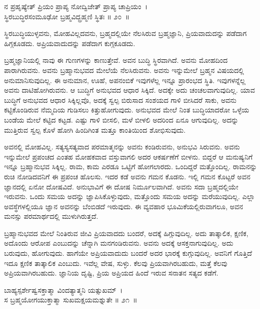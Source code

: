 \begin{shloka}
ನ ಪ್ರಹೃಷ್ಯೇತ್ ಪ್ರಿಯಂ ಪ್ರಾಪ್ಯ ನೋದ್ವಿಜೇತ್ ಪ್ರಾಪ್ಯ ಚಾಪ್ರಿಯಂ~।\\ಸ್ಥಿರಬುದ್ಧಿರಸಂಮೂಢೋ ಬ್ರಹ್ಮವಿದ್ಬ್ರಹ್ಮಣಿ ಸ್ಥಿತಃ \hfill॥ ೨೦~॥
\end{shloka}

\begin{artha}
ಸ್ಥಿರಬುದ್ಧಿಯುಳ್ಳವನು, ಮೋಹವಿಲ್ಲದವನು, ಬ್ರಹ್ಮದಲ್ಲಿಯೇ ನೆಲಸಿರುವ ಬ್ರಹ್ಮಜ್ಞಾನಿ, ಪ್ರಿಯವಾದುದನ್ನು ಪಡೆದಾಗ ಹಿಗ್ಗಕೂಡದು. ಅಪ್ರಿಯವಾದುದನ್ನು ಪಡೆದಾಗ ಕುಗ್ಗಕೂಡದು.
\end{artha}

ಬ್ರಹ್ಮಜ್ಞಾನಿಯಲ್ಲಿ ನಾವು ಈ ಗುಣಗಳನ್ನು ಕಾಣುತ್ತೇವೆ. ಅವನ ಬುದ್ಧಿ ಸ್ಥಿರವಾಗಿದೆ. ಅವನು ಮೋಹದಿಂದ ಪಾರಾಗಿರುವನು. ಅವನು ಬ್ರಹ್ಮಾನುಭವದ ಮೇಲೆಯೆ ನೆಲಸಿರುವನು. ಅವನು ಇನ್ನುಮೇಲೆ ಬ್ರಹ್ಮನ ವಿಷಯದಲ್ಲಿ ಅನುಮಾನಿಸುವುದಿಲ್ಲ. ಈ ಅನುಮಾನ, ಊಹೆ, ಅಪನಂಬಿಕೆ ಇವುಗಳೆಲ್ಲ ಇನ್ನೂ ಪ್ರಾರಂಭದ ಸ್ಥಿತಿ. ಇವುಗಳನ್ನೆಲ್ಲ ಅವನು ದಾಟಿಹೋಗಿರುವನು. ಆ ಬುದ್ಧಿಗೆ ಅನುಭವದ ಆಧಾರ ಸಿಕ್ಕಿದೆ. ಅದಕ್ಕೇ ಅದು ಚಂಚಲವಾಗುವುದಿಲ್ಲ. ಯಾವ ಬುದ್ಧಿಗೆ ಅನುಭವದ ಆಧಾರ ಸಿಕ್ಕಿಲ್ಲವೊ, ಅದಕ್ಕೆ ಸ್ವಲ್ಪ ಬಿರುಸಾದ ಸಂಶಯದ ಗಾಳಿ ಬೀಸಿದರೆ ಸಾಕು, ಅವನು ಕಟ್ಟಿಕೊಂಡಿರುವ ನೆಮ್ಮದಿಯ ಗುಡಿಸಲು ಕಿತ್ತುಹೋಗುವುದು. ಅನುಭವದ ಮೇಲೆ ನಿಂತ ಬುದ್ಧಿಯಾದರೋ ಒಳ್ಳೆಯ ಬಂಡೆಯ ಮೇಲೆ ಕಟ್ಟಿದ ಕಟ್ಟಡ. ಎಷ್ಟು ಗಾಳಿ ಬೀಸಲಿ, ಮಳೆ ಬೀಳಲಿ ಅದರಿಂದ ಏನೂ ಆಗುವುದಿಲ್ಲ. ಅದನ್ನು ಮುತ್ತಿರುವ ಸ್ವಲ್ಪ ಕೊಳೆ ಹೋಗಿ ಹಿಂದಿಗಿಂತ ಮತ್ತೂ ಕಾಂತಿಯಿಂದ ಶೋಭಿಸುವುದು.

ಅವನಲ್ಲಿ ಮೋಹವಿಲ್ಲ. ಸತ್ಯಸ್ಯಸತ್ಯವಾದ ಪರಮಾತ್ಮನನ್ನು ಅವನು ಕಂಡಿರುವನು, ಅನುಭವಿ ಸಿರುವನು. ಅವನು ಇನ್ನುಮೇಲೆ ಪ್ರಪಂಚದ ಎಂತಹ ಮೋಹಕವಾದ ವಸ್ತುವಾಗಲಿ ಅದರ ಆಕರ್ಷಣೆಗೆ ಬೀಳನು. ಬಿದ್ದರೆ ಆ ಮನುಷ್ಯನಿಗೆ ಇನ್ನೂ ಬ್ರಹ್ಮಾನುಭವ ಸಿಕ್ಕಿಲ್ಲ. ರಾಮ, ಕಾಮ ಎರಡೂ ಒಟ್ಟಿಗೆ ಹೋಗಲಾರದು. ಒಂದಿದ್ದರೆ ಮತ್ತೊಂದಿಲ್ಲ. ರಾಮನನ್ನು ರುಚಿ ನೋಡಿದವನಿಗೆ ಈ ಪ್ರಪಂಚ ಹೊಲಸು. ಇದರ ಕಡೆ ಅವನು ಗಮನ ಕೊಡನು. ಇಲ್ಲಿ ಗಮನ ಕೊಟ್ಟರೆ ಅವನ ಜ್ಞಾನದಲ್ಲಿ ಏನೋ ದೋಷವಿದೆ. ಅನುಭಾವಿಗೆ ಈ ದೋಷ ನಿರ್ಮೂಲವಾಗಿದೆ. ಅವನು ಸದಾ ಬ್ರಹ್ಮದಲ್ಲಿಯೇ ಇರುವನು. ಒಂದು ಸಮಯ ಅದನ್ನು ಜ್ಞಾಪಿಸಿಕೊಳ್ಳುವುದು, ಮತ್ತೊಂದು ಸಮಯ ಅದನ್ನು ಮರೆಯುವುದಿಲ್ಲ. ಎಲ್ಲಾ ಅವಸ್ಥೆಗಳಲ್ಲಿಯೂ ಜ್ಞಾನ ಅವನನ್ನು ಬೆಂಬಿಡದೆ ಇರುವುದು. ಈ ವ್ಯವಹಾರ ಭೂಮಿಕೆಯಲ್ಲಿರುವಾಗಲೂ, ಅವನ ಮನಸ್ಸು ಪರಮಾರ್ಥದಲ್ಲಿ ಮುಳುಗಿರುತ್ತದೆ.

ಬ್ರಹ್ಮಾನುಭವದ ಮೇಲೆ ನಿಂತಿರುವ ಜೀವಿ ಪ್ರಿಯವಾದದು ಬಂದರೆ, ಅದಕ್ಕೆ ಹಿಗ್ಗುವುದಿಲ್ಲ. ಅದು ತಾತ್ಕಾಲಿಕ, ಕ್ಷಣಿಕ, ಅದೊಂದು ಆರೋಪ ಎಂಬುದನ್ನು ಚೆನ್ನಾಗಿ ಮನಗಂಡಿರುವನು. ಅವನು ಅದಕ್ಕೆ ಆಸಕ್ತನಾಗುವುದಿಲ್ಲ. ಅದು ಬರುವುದು, ಹೋಗುವುದು. ಹಾಗೆಯೇ ಅಪ್ರಿಯವಾದುದು ಬಂದರೆ ಅದರ ಭಾರಕ್ಕೆ ಕುಗ್ಗುವುದಿಲ್ಲ. ಅವನಿಗೆ ಗೊತ್ತಿದೆ ಇದೂ ಕ್ಷಣಿಕ ತಾತ್ಕಾಲಿಕ ಎಂಬುದು. ಇವೆಲ್ಲ ವೇಷ, ಸುಳ್ಳು. ಕೆಲವು ಪ್ರಿಯವಾಗಿರಬಹುದು, ಮತ್ತೆ ಕೆಲವು ಅಪ್ರಿಯವಾಗಿರಬಹುದು. ಜ್ಞಾನಿಯ ದೃಷ್ಟಿ, ಪ್ರಿಯ ಅಪ್ರಿಯದ ಹಿಂದೆ ಇರುವ ಸನಾತನ ಸತ್ಯದ ಕಡೆಗೆ.

\begin{shloka}
ಬಾಹ್ಯಸ್ಪರ್ಶೇಷ್ವಸಕ್ತಾತ್ಮಾ ವಿಂದತ್ಯಾತ್ಮನಿ ಯತ್ಸುಖಮ್~।\\ಸ ಬ್ರಹ್ಮಯೋಗಯುಕ್ತಾತ್ಮಾ ಸುಖಮಕ್ಷಯಮಶ್ನುತೇ \hfill॥ ೨೧~॥
\end{shloka}

